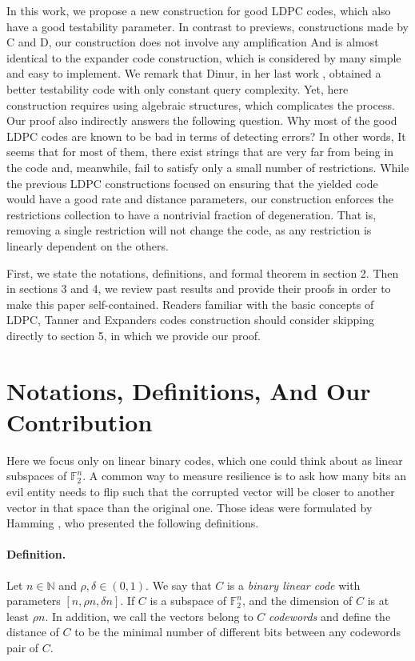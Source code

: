 \documentclass{article}
\begin{document}
\begin{multicols*}{2}
In this work, we propose a new construction for good LDPC codes, which also have a good testability parameter. In contrast to previews, constructions made by C and D, our construction does not involve any amplification And is almost identical to the expander code construction, which is considered by many simple and easy to implement. We remark that Dinur, in her last work \cite{Dinur}, obtained a better testability code with only constant query complexity. Yet, here construction requires using algebraic structures, which complicates the process.
Our proof also indirectly answers the following question. Why most of the good LDPC codes are known to be bad in terms of detecting errors? In other words, It seems that for most of them, there exist strings that are very far from being in the code and, meanwhile, fail to satisfy only a small number of restrictions.
While the previous LDPC constructions focused on ensuring that the yielded code would have a good rate and distance parameters, our construction enforces the restrictions collection to have a nontrivial fraction of degeneration. That is, removing a single restriction will not change the code, as any restriction is linearly dependent on the others.

First, we state the notations, definitions, and formal theorem in section 2. Then in sections 3 and 4, we review past results and provide their proofs in order to make this paper self-contained. Readers familiar with the basic concepts of LDPC, Tanner and Expanders codes construction should consider skipping directly to section 5, in which we provide our proof. 
\section{Notations, Definitions, And Our Contribution}
Here we focus only on linear binary codes, which one could think about as linear subspaces of $\mathbb{F}_{2}^{n}$. A common way to measure resilience is to ask how many bits an evil entity needs to flip such that the corrupted vector will be closer to another vector in that space than the original one. Those ideas were formulated by Hamming \cite{Hamming}, who presented the following definitions. 
\paragraph{Definition.} Let $n \in \mathbb{N}$ and $\rho, \delta\in \left( 0,1 \right)$. We say that $C$ is a \textit{binary linear code} with parameters $[n, \rho n, \delta n]$. If $C$ is a subspace of $\mathbb{F}_{2}^{n}$, and the dimension of $C$ is at least $\rho n$. In addition, we call the vectors belong to $C$ \textit{codewords} and define the distance of $C$ to be the minimal number of different bits between any codewords pair of $C$.   


\end{multicols*}
\end{document}
